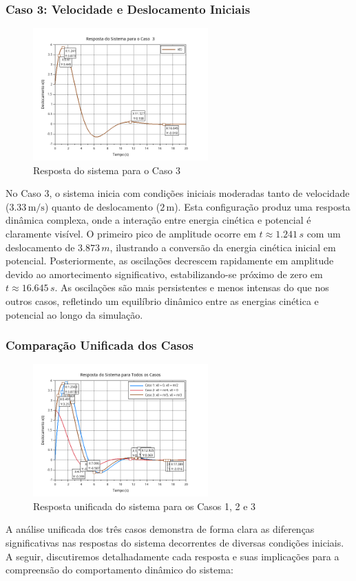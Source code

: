 \subsubsection{Caso 3: Velocidade e Deslocamento Iniciais}
\begin{figure}[H]
    \centering
    \includegraphics[width=0.6\textwidth]{atividades/1-atividade/assets/caso3.png}
    \caption{Resposta do sistema para o Caso 3}
\end{figure}
No Caso 3, o sistema inicia com condições iniciais moderadas tanto de velocidade (\(3.33 \, \text{m/s}\)) quanto de deslocamento (\(2 \, \text{m}\)). Esta configuração produz uma resposta dinâmica complexa, onde a interação entre energia cinética e potencial é claramente visível. O primeiro pico de amplitude ocorre em \(t \approx 1.241 \, s\) com um deslocamento de \(3.873 \, m\), ilustrando a conversão da energia cinética inicial em potencial. Posteriormente, as oscilações decrescem rapidamente em amplitude devido ao amortecimento significativo, estabilizando-se próximo de zero em \(t \approx 16.645 \, s\). As oscilações são mais persistentes e menos intensas do que nos outros casos, refletindo um equilíbrio dinâmico entre as energias cinética e potencial ao longo da simulação.

\subsubsection{Comparação Unificada dos Casos}
\begin{figure}[H]
    \centering
    \includegraphics[width=0.6\textwidth]{atividades/1-atividade/assets/caso-all-in-one.png}
    \caption{Resposta unificada do sistema para os Casos 1, 2 e 3}
\end{figure}
A análise unificada dos três casos demonstra de forma clara as diferenças significativas nas respostas do sistema decorrentes de diversas condições iniciais. A seguir, discutiremos detalhadamente cada resposta e suas implicações para a compreensão do comportamento dinâmico do sistema:

